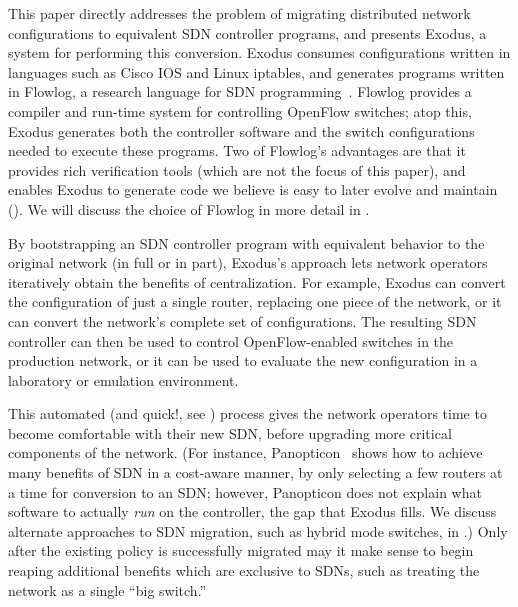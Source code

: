 
%
This paper directly addresses the problem of migrating distributed network
configurations to equivalent SDN controller programs, and presents Exodus, a
system for performing this conversion. Exodus consumes configurations written
in languages such as Cisco IOS and Linux iptables, and generates programs written in Flowlog, a research
language for SDN programming~\cite{ngdfk:hotsdn13-flowlog}.  Flowlog
provides a compiler and run-time system for controlling OpenFlow switches;
atop this, Exodus generates both the controller software and the switch
configurations needed to execute these programs.  
Two of Flowlog's advantages are that it provides rich verification tools (which are not the
focus of this paper), and enables Exodus to generate code we believe is easy to
later evolve and maintain ().
We will discuss the choice of Flowlog in more detail in . 

By bootstrapping an SDN controller program with equivalent behavior to
the original network (in full or in part), Exodus's approach lets network
operators iteratively obtain the benefits of centralization.  
For example, Exodus can convert the configuration of just a single router, 
replacing one piece of the network, or it can convert the network's complete
set of configurations. The resulting SDN controller can then be used
to control OpenFlow-enabled switches in the production network,
or it can be used to evaluate the new configuration in a laboratory or
emulation environment.

This automated (and quick!, see ) process gives the network operators time to become
comfortable with their new SDN, before upgrading more critical
components of the network. (For instance, Panopticon~\cite{levin13panopticonTR} shows how
to achieve many benefits of SDN in a cost-aware manner, by only selecting
a few routers at a time for conversion to an SDN; however, Panopticon
does not explain what software to actually \emph{run} on the
controller, the gap that Exodus fills. We discuss alternate approaches to
SDN migration, such as hybrid mode switches, in .)  Only
after the existing policy is successfully migrated may it make sense
to begin reaping additional benefits which are exclusive to SDNs, such
as treating the network as a single ``big switch.''

